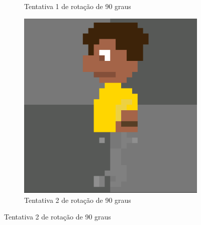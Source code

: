 \begin{figure}[htbp]
\begin{subfigure}{0.32\linewidth}
        \caption{\small Tentativa 1 de rotação de 90 graus}
        \label{fig:pixelLabRot2b}
    \end{subfigure}
    \begin{subfigure}{0.32\linewidth}
        \includegraphics[width=1\linewidth]{figs/pixelLab/dia2/rot90res2.PNG}
        \caption{\small Tentativa 2 de rotação de 90 graus}
        \label{fig:pixelLabRot2c}
    \end{subfigure}
\end{figure}

